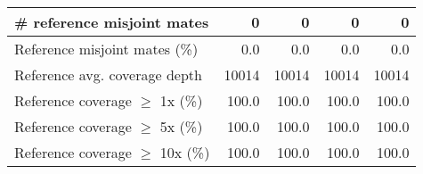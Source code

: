 \documentclass[12pt,a4paper]{article}
\begin{document}
\begin{table}[ht]
\begin{center}
\begin{tabular}{|l*{4}{|r}|}
\# reference misjoint mates & 0 & 0 & 0 & 0 \\ \hline
Reference misjoint mates (\%) & 0.0 & 0.0 & 0.0 & 0.0 \\ \hline
Reference avg. coverage depth & 10014 & 10014 & 10014 & 10014 \\ \hline
Reference coverage $\geq$ 1x (\%) & 100.0 & 100.0 & 100.0 & 100.0 \\ \hline
Reference coverage $\geq$ 5x (\%) & 100.0 & 100.0 & 100.0 & 100.0 \\ \hline
Reference coverage $\geq$ 10x (\%) & 100.0 & 100.0 & 100.0 & 100.0 \\ \hline
\end{tabular}
\end{center}
\end{table}
\end{document}
